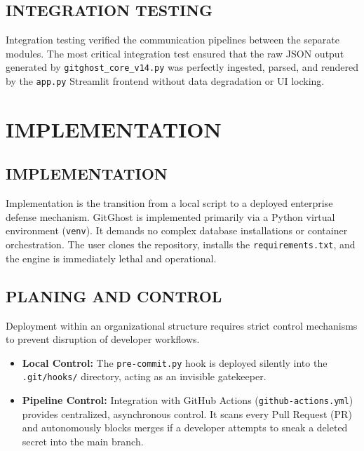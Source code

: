 \documentclass[12pt, a4paper, oneside]{report}
\begin{document}
\section{INTEGRATION TESTING}
Integration testing verified the communication pipelines between the separate modules. The most critical integration test ensured that the raw JSON output generated by \texttt{gitghost\_core\_v14.py} was perfectly ingested, parsed, and rendered by the \texttt{app.py} Streamlit frontend without data degradation or UI locking.

\chapter{IMPLEMENTATION}

\section{IMPLEMENTATION}
Implementation is the transition from a local script to a deployed enterprise defense mechanism. GitGhost is implemented primarily via a Python virtual environment (\texttt{venv}). It demands no complex database installations or container orchestration. The user clones the repository, installs the \texttt{requirements.txt}, and the engine is immediately lethal and operational.

\section{PLANING AND CONTROL}
Deployment within an organizational structure requires strict control mechanisms to prevent disruption of developer workflows. 
\begin{itemize}
    \item \textbf{Local Control:} The \texttt{pre-commit.py} hook is deployed silently into the \texttt{.git/hooks/} directory, acting as an invisible gatekeeper.
    \item \textbf{Pipeline Control:} Integration with GitHub Actions (\texttt{github-actions.yml}) provides centralized, asynchronous control. It scans every Pull Request (PR) and autonomously blocks merges if a developer attempts to sneak a deleted secret into the main branch.
\end{itemize}

\end{document}

